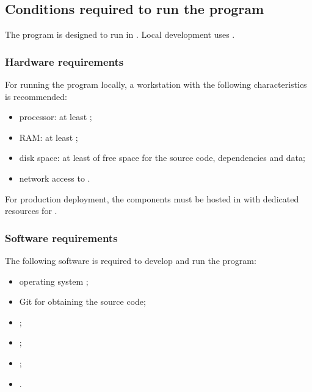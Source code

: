 \documentclass[12pt,a4paper]{extarticle}
\begin{document}
\subsection{Conditions required to run the program}

\begin{hseExample}
The program is designed to run in . Local development uses .
\end{hseExample}

\subsubsection{Hardware requirements}

\begin{hseExample}
For running the program locally, a workstation with the following characteristics is recommended:

\begin{itemize}[leftmargin=1.25cm]
    \item processor: at least ;
    \item RAM: at least ;
    \item disk space: at least  of free space for the source code, dependencies and data;
    \item network access to .
\end{itemize}

For production deployment, the components must be hosted in  with dedicated resources for .
\end{hseExample}

\subsubsection{Software requirements}

\begin{hseExample}
The following software is required to develop and run the program:

\begin{itemize}[leftmargin=1.25cm]
    \item operating system ;
    \item Git for obtaining the source code;
    \item {};
    \item {};
    \item {};
    \item {}.
\end{itemize}
\end{hseExample}
\end{document}
